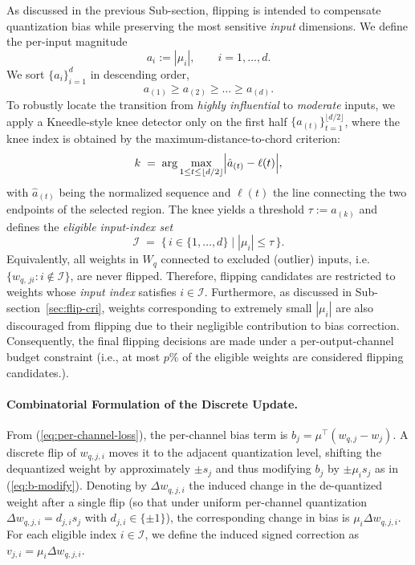 \documentclass[table, 11pt]{article}
\begin{document}
As discussed in the previous Sub-section, flipping is intended to compensate quantization bias while preserving the most sensitive \emph{input} dimensions. We define the per-input magnitude
\[
a_i := |\mu_i|,\qquad i=1,\dots,d .
\]
We sort $\{a_i\}_{i=1}^{d}$ in descending order,
\[
a_{(1)} \ge a_{(2)} \ge \dots \ge a_{(d)} .
\]
To robustly locate the transition from \emph{highly influential} to \emph{moderate} inputs, we apply a Kneedle-style knee detector only on the first half
$\{a_{(t)}\}_{t=1}^{\lfloor d/2 \rfloor}$, where the knee index is obtained by the maximum-distance-to-chord criterion:
\[
k \;=\; \arg\max_{1 \le t \le \lfloor d/2 \rfloor}\Bigl|\hat a_{(t)} - \ell(t)\Bigr| ,
\]
with $\hat a_{(t)}$ being the normalized sequence and $\ell(t)$ the line connecting the two endpoints of the selected region.
The knee yields a threshold $\tau := a_{(k)}$ and defines the \emph{eligible input-index set}
\[
\mathcal{I} \;=\; \{\, i \in \{1,\dots,d\} \mid |\mu_i| \le \tau \,\}.
\]
Equivalently, all weights in $W_q$ connected to excluded (outlier) inputs, i.e.\ $\{w_{q,\,j i}: i \notin \mathcal{I}\}$, are never flipped.
Therefore, flipping candidates are restricted to weights whose \emph{input index} satisfies $i \in \mathcal{I}$.
Furthermore, as discussed in Sub-section~\ref{sec:flip-cri}, 
weights corresponding to extremely small $|\mu_i|$ are also discouraged from flipping due to their negligible contribution to bias correction. Consequently, the final flipping decisions are made under a per-output-channel 
budget constraint (i.e., at most $p\%$ of the eligible weights are considered flipping candidates.).

\paragraph{Combinatorial Formulation of the Discrete Update.}

From (\ref{eq:per-channel-loss}), the per-channel bias term is 
$b_j = \mu^\top (w_{q,j} - w_j)$. A discrete flip of $w_{q,j,i}$ moves it to the adjacent quantization level, shifting the dequantized weight by approximately $\pm s_j$ and thus modifying $b_j$ by $\pm \mu_i s_j$ as in (\ref{eq:b-modify}). Denoting by $\Delta w_{q,j,i}$ the induced change in the de-quantized weight after a single flip (so that under uniform per-channel quantization $\Delta w_{q,j,i} = d_{j,i}s_j$ with $d_{j,i}\in\{\pm1\}$), the corresponding change in bias is $\mu_i \Delta w_{q,j,i}$. For each eligible index $i \in \mathcal{I}$, we define the induced signed correction as $v_{j,i} = \mu_i \Delta w_{q,j,i}$.
\end{document}
